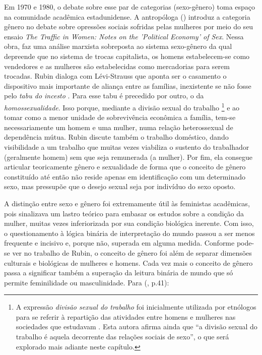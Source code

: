 Em 1970 e 1980, o debate sobre esse par de categorias (sexo-gênero) toma espaço na comunidade acadêmica estadunidense. A antropóloga  (\citeyear{RUBIN1975})  introduz a categoria gênero no debate sobre opressões sociais sofridas pelas mulheres por meio do seu ensaio \emph{The Traffic in Women: Notes on the 'Political Economy' of Sex}. Nessa obra,  faz uma análise marxista sobreposta ao sistema sexo-gênero da qual depreende que no sistema de trocas capitalista, os homens estabelecem-se como vendedores e as mulheres são estabelecidas como mercadorias para serem trocadas.
Rubin dialoga com Lévi-Strauss que aponta ser o casamento o dispositivo mais importante de aliança entre as famílias, inexistente se não fosse pelo \emph{tabu do incesto} \cite{STRAUSS2010}. Para  esse tabu é precedido por outro, o da \emph{homossexualidade}. Isso porque, mediante a divisão sexual do trabalho%
\footnote{A expressão \emph{divisão sexual do trabalho} foi inicialmente utilizada por etnólogos para se referir à repartição das atividades entre homens e mulheres nas sociedades que estudavam \cite{KERGOAT2004}. Esta autora afirma ainda que ``a divisão sexual do trabalho é aquela decorrente das relações sociais de sexo'', o que será explorado mais adiante neste capítulo.} e ao tomar como a menor unidade de sobrevivência econômica a família, tem-se necessariamente um homem e uma mulher, numa relação heterossexual de dependência mútua. Rubin discute também o trabalho doméstico, dando visibilidade a um trabalho que muitas vezes viabiliza o sustento do trabalhador (geralmente homem) sem que seja remunerada (a mulher). Por fim, ela consegue articular teoricamente gênero e sexualidade de forma que o conceito de gênero constituído até então não reside apenas em identificação com um determinado sexo, mas pressupõe que o desejo sexual seja por indivíduo do sexo oposto. 

A distinção entre sexo e gênero foi extremamente útil às feministas acadêmicas, pois sinalizava um lastro teórico para embasar os estudos sobre a condição da mulher, muitas vezes inferiorizada por sua condição biológica inerente. Com isso, o questionamento à lógica binária de interpretação do mundo passou a ser menos frequente e incisivo \cite[p.218]{HARAWAY2004} e, porque não, superada em alguma medida. Conforme pode-se ver no trabalho de Rubin, o conceito de gênero foi além de separar dimensões culturais e biológicas de mulheres e homens. Cada vez mais o conceito de gênero passa a significar também a superação da leitura binária de mundo que só permite feminilidade ou masculinidade. Para  (\citeyear{HEILBORN1992}, p.41):

